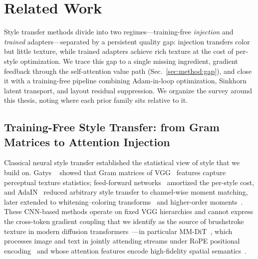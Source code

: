 \section{Related Work}
\label{sec:related}

Style transfer methods divide into two regimes---training-free \emph{injection}
and \emph{trained} adapters---separated by a persistent quality gap: injection
transfers color but little texture, while trained adapters achieve rich texture
at the cost of per-style optimization.
We trace this gap to a single missing ingredient, gradient feedback through the
self-attention value path (Sec.~\ref{sec:method:gap}), and close it with a
training-free pipeline combining Adam-in-loop optimization, Sinkhorn latent
transport, and layout residual suppression.
We organize the survey around this thesis, noting where each prior family sits
relative to it.

\subsection{Training-Free Style Transfer: from Gram Matrices to Attention
Injection}

Classical neural style transfer established the statistical view of
style that we build on.
Gatys \etal~\cite{gatys2016image} showed that Gram matrices of
VGG~\cite{simonyan2015vgg} features capture perceptual texture statistics;
feed-forward networks~\cite{johnson2016perceptual} amortized the per-style
cost, and AdaIN~\cite{huang2017arbitrary} reduced arbitrary style transfer to
channel-wise moment matching, later extended to whitening--coloring
transforms~\cite{li2017universal} and higher-order moments~\cite{hsi2025}.
These CNN-based methods operate on fixed VGG hierarchies and cannot
express the cross-token gradient coupling that we identify as the source of
brushstroke texture in modern diffusion
transformers~\cite{peebles2023scalable,dosovitskiy2021vit}---in particular
MM-DiT~\cite{esser2024scaling}, which processes image and text in jointly
attending streams under RoPE positional encoding~\cite{su2024rope} and whose
attention features encode high-fidelity spatial
semantics~\cite{seg4diff2025,gan2025ditf}.

